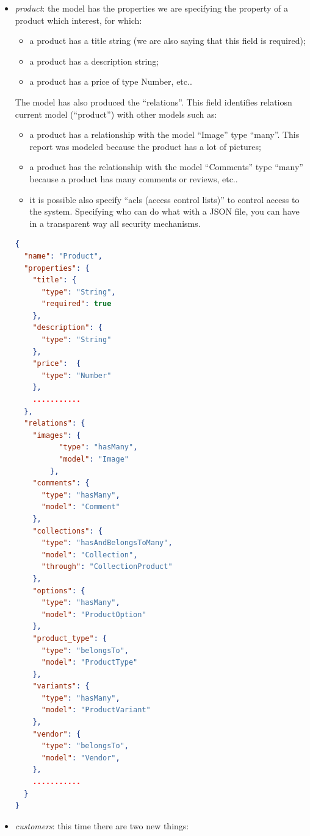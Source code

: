 \begin{itemize}
  \item \emph{product}: the model has the properties we are specifying the property of a product which interest, for which:
\begin{itemize}
\item a product has a title string (we are also saying that this field is required);
\item a product has a description string;
\item a product has a price of type Number, etc..
\end{itemize}
The model has also produced the “relations”. This field identifies relatiosn current model (“product”) with other models such as:
\begin{itemize}
\item a product has a relationship with the model “Image” type “many”. This report was modeled because the product has a lot of pictures;
\item a product has the relationship with the model “Comments” type “many” because a product has many comments or reviews, etc..
\item it is possible also specify “acls (access control lists)” to control access to the system. Specifying who can do what with a JSON file, you can have in a transparent way all security mechanisms.
\end{itemize}
\begin{lstlisting}[language=json]
{
  "name": "Product",
  "properties": {
    "title": {
      "type": "String",
      "required": true
    },
    "description": {
      "type": "String"
    },
    "price":  {
      "type": "Number"
    },
    ...........
  },
  "relations": {
    "images": {
          "type": "hasMany",
          "model": "Image"
        },
    "comments": {
      "type": "hasMany",
      "model": "Comment"
    },
    "collections": {
      "type": "hasAndBelongsToMany",
      "model": "Collection",
      "through": "CollectionProduct"
    },
    "options": {
      "type": "hasMany",
      "model": "ProductOption"
    },
    "product_type": {
      "type": "belongsTo",
      "model": "ProductType"
    },
    "variants": {
      "type": "hasMany",
      "model": "ProductVariant"
    },
    "vendor": {
      "type": "belongsTo",
      "model": "Vendor",
    },
    ...........
  }
}
\end{lstlisting}
\item \emph{customers}: this time there are two new things:
\begin{itemize}

\end{itemize}
\end{itemize}
